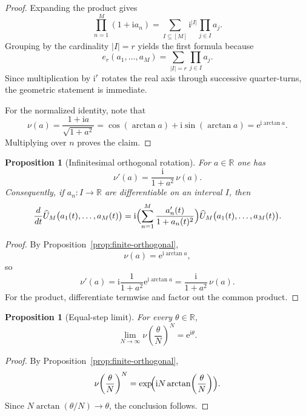 \documentclass[11pt]{amsart}
\numberwithin{equation}{section}
\newtheorem{proposition}[theorem]{Proposition}
\theoremstyle{definition}
\theoremstyle{remark}
\newcommand{\RR}{\mathbb R}
\newcommand{\e}{\mathrm e}
\newcommand{\ii}{\mathrm i}
\begin{document}
\begin{proof}
Expanding the product gives
\[
\prod_{n=1}^M (1+\ii a_n)=\sum_{I\subseteq [M]} \ii^{|I|}\prod_{j\in I} a_j.
\]
Grouping by the cardinality $|I|=r$ yields the first formula because
\[
e_r(a_1,\dots,a_M)=\sum_{|I|=r}\prod_{j\in I}a_j.
\]
Since multiplication by $\ii^r$ rotates the real axis through successive quarter-turns, the geometric statement is immediate.

For the normalized identity, note that
\[
\nu(a)=\frac{1+\ii a}{\sqrt{1+a^2}}=
\cos(\arctan a)+\ii\sin(\arctan a)=\e^{\ii\arctan a}.
\]
Multiplying over $n$ proves the claim.
\end{proof}

\begin{proposition}[Infinitesimal orthogonal rotation]\label{prop:derivative-nu}
For $a\in\RR$ one has
\[
\nu'(a)=\frac{\ii}{1+a^2}\,\nu(a).
\]
Consequently, if $a_n:I\to\RR$ are differentiable on an interval $I$, then
\[
\frac{d}{dt}\widehat U_M\bigl(a_1(t),\dots,a_M(t)\bigr)
=\ii\Bigl(\sum_{n=1}^M \frac{a_n'(t)}{1+a_n(t)^2}\Bigr)
\widehat U_M\bigl(a_1(t),\dots,a_M(t)\bigr).
\]
\end{proposition}

\begin{proof}
By Proposition~\ref{prop:finite-orthogonal},
\[
\nu(a)=\e^{\ii\arctan a},
\]
so
\[
\nu'(a)=\ii\frac{1}{1+a^2}\e^{\ii\arctan a}=\frac{\ii}{1+a^2}\,\nu(a).
\]
For the product, differentiate termwise and factor out the common product.
\end{proof}

\begin{proposition}[Equal-step limit]\label{prop:equal-step-limit}
For every $\theta\in\RR$,
\[
\lim_{N\to\infty}\nu\!\left(\frac{\theta}{N}\right)^N=\e^{\ii\theta}.
\]
\end{proposition}

\begin{proof}
By Proposition~\ref{prop:finite-orthogonal},
\[
\nu\!\left(\frac{\theta}{N}\right)^N
=\exp\!\Bigl(\ii N\arctan\!\left(\frac{\theta}{N}\right)\Bigr).
\]
Since $N\arctan(\theta/N)\to \theta$, the conclusion follows.
\end{proof}
\end{document}
